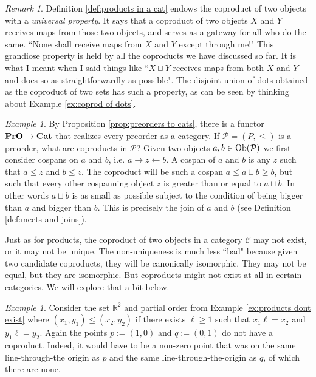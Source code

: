 \documentclass{book}
\def\tn{\textnormal}
\def\mc{\mathcal}
\def\RR{{\mathbb R}}
\def\Ob{\tn{Ob}}
\def\to{\rightarrow}
\def\from{\leftarrow}
\def\Cat{{\bf Cat}}
\def\PrO{{\bf PrO}}
\def\mcC{\mc{C}}
\def\mcP{\mc{P}}
\theoremstyle{remark}
\newtheorem{remark}[subsubsection]{Remark}
\newtheorem{example}[subsubsection]{Example}
\theoremstyle{definition}
\begin{document}
\begin{remark}

Definition \ref{def:products in a cat} endows the coproduct of two objects with a {\em universal property}. It says that a coproduct of two objects $X$ and $Y$ receives maps from those two objects, and serves as a gateway for all who do the same. ``None shall receive maps from $X$ and $Y$ except through me!" This grandiose property is held by all the coproducts we have discussed so far. It is what I meant when I said things like ``$X\sqcup Y$ receives maps from both $X$ and $Y$ and does so as straightforwardly as possible".  The disjoint union of dots obtained as the coproduct of two sets has such a property, as can be seen by thinking about Example \ref{ex:coprod of dots}.

\end{remark}

\begin{example}

By Proposition \ref{prop:preorders to cats}, there is a functor $\PrO\to\Cat$\index{a functor!$\PrO\to\Cat$} that realizes every preorder as a category. If $\mcP=(P,\leq)$ is a preorder, what are coproducts in $\mcP$? Given two objects $a,b\in\Ob(\mcP)$ we first consider cospans on $a$ and $b$, i.e. $a\to z\from b$. A cospan of $a$ and $b$ is any $z$ such that $a\leq z$ and $b\leq z$. The coproduct will be such a cospan $a\leq a\sqcup b\geq b$, but such that every other cospanning object $z$ is greater than or equal to $a\sqcup b$. In other words $a\sqcup b$ is as small as possible subject to the condition of being bigger than $a$ and bigger than $b$. This is precisely the join of $a$ and $b$ (see Definition \ref{def:meets and joins}).

\end{example}

Just as for products, the coproduct of two objects in a category $\mcC$ may not exist, or it may not be unique. The non-uniqueness is much less ``bad" because given two candidate coproducts, they will be canonically isomorphic. They may not be equal, but they are isomorphic. But coproducts might not exist at all in certain categories. We will explore that a bit below.

\begin{example}

Consider the set $\RR^2$ and partial order from Example \ref{ex:products dont exist} where $(x_1,y_1)\leq (x_2,y_2)$ if there exists $\ell\geq 1$ such that $x_1\ell=x_2$ and $y_1\ell=y_2$. Again the points $p:=(1,0)$ and $q:=(0,1)$ do not have a coproduct. Indeed, it would have to be a non-zero point that was on the same line-through-the origin as $p$ and the same line-through-the-origin as $q$, of which there are none.

\end{example}
\end{document}
